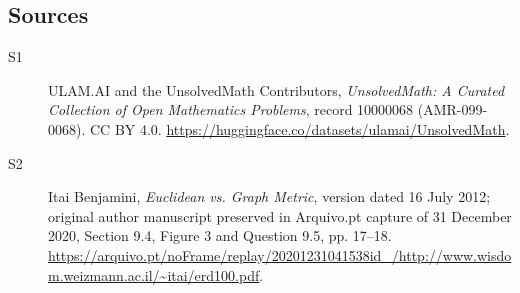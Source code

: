 \documentclass[11pt]{article}
\begin{document}
\subsection{Sources}
\begin{description}
\item[\hypertarget{source:10000068:1}{S1}] ULAM.AI and the UnsolvedMath Contributors, \emph{UnsolvedMath: A Curated Collection of Open Mathematics Problems}, record 10000068 (AMR-099-0068). CC BY 4.0. \url{https://huggingface.co/datasets/ulamai/UnsolvedMath}.
\item[\hypertarget{source:10000068:2}{S2}] Itai Benjamini, \emph{Euclidean vs. Graph Metric}, version dated 16 July 2012; original author manuscript preserved in Arquivo.pt capture of 31 December 2020, Section 9.4, Figure 3 and Question 9.5, pp. 17--18. \url{https://arquivo.pt/noFrame/replay/20201231041538id_/http://www.wisdom.weizmann.ac.il/~itai/erd100.pdf}.
\end{description}
\label{end:10000068}
\end{document}
